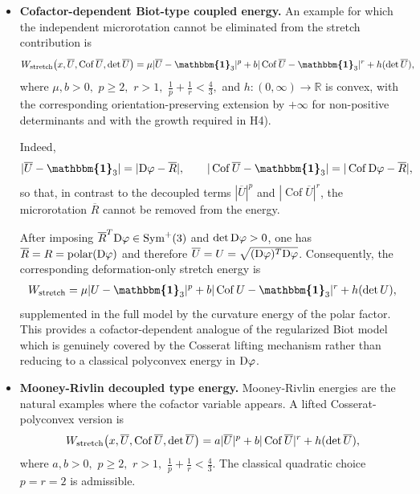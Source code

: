\documentclass[11pt]{article}
\newcommand{\id}{{\boldsymbol{\mathbbm{1}}}}
\DeclareMathOperator{\Cof}{Cof}
\begin{document}
\begin{itemize}
\item \textbf{Cofactor-dependent Biot-type coupled energy.}
An example for which the independent microrotation cannot
be eliminated from the stretch contribution is
\begin{align}
W_{\rm stretch}
\bigl(x,\overline U,\Cof\overline U,\det\overline U\bigr)
={}&
\mu|\overline U-\id_3|^p
+
b|\Cof\overline U-\id_3|^r
+
h(\det\overline U),
\end{align}
where
$
\mu,b>0, $ $
p\geq2,$ $
r>1,$  $
\frac1p+\frac1r<\frac43,
$
and $h:(0,\infty)\to\mathbb R$ is convex, with the corresponding
orientation-preserving extension by $+\infty$ for non-positive
determinants and with the growth required in H4).

Indeed,
\begin{align}
|\overline U-\id_3|
&=
|{\rm D}\varphi-\overline R|,
\qquad 
|\Cof\overline U-\id_3|
=
|\Cof{\rm D}\varphi-\overline R|,
\end{align}
so that, in contrast to the decoupled terms
$|\overline U|^p$ and $|\Cof\overline U|^r$, the microrotation
$\overline R$ cannot be removed from the energy.

After imposing
$\overline R^T{\rm D}\varphi\in\operatorname{Sym}^+(3)$ and
$\det{\rm D}\varphi>0$, one has
$\overline R=R=\operatorname{polar}({\rm D}\varphi)$ and therefore
$\overline U=U=\sqrt{({\rm D}\varphi)^T{\rm D}\varphi}$. Consequently,
the corresponding deformation-only stretch energy is
\begin{align}
W_{\rm stretch}
=
\mu|U-\id_3|^p
+
b|\Cof U-\id_3|^r
+
h(\det U),
\end{align}
supplemented in the full model by the curvature energy of the polar factor.
This provides a cofactor-dependent analogue of the regularized Biot model
which is genuinely covered by the Cosserat lifting mechanism rather than
reducing to a classical polyconvex energy in ${\rm D}\varphi$.

\item \textbf{Mooney-Rivlin  decoupled  type energy.}
Mooney-Rivlin energies are the natural examples where the cofactor variable
appears. A lifted Cosserat-polyconvex version is
\begin{align}
        W_{\rm stretch}\bigl(x,\overline U,\Cof \overline U,\det \overline U\bigr)
        =
        a | \overline U | ^p
        +
        b | \Cof \overline U | ^r
        +
        h(\det \overline U),
\end{align}
where
$
        a,b>0,
              $ $
        p\geq2,
         $ $
        r>1,
         $ $
        \frac1p+\frac1r<\frac43.
$
The classical quadratic choice
$
        p=r=2
$
is admissible.


\end{itemize}
\end{document}
